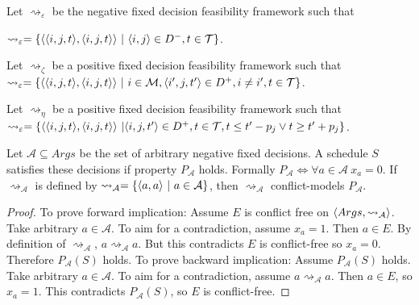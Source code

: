 \begin{definition}
	\label{intervalepsilon}
	
	Let $\rightsquigarrow_\varepsilon$ be the negative fixed decision feasibility framework such that
	
	$\rightsquigarrow_\varepsilon=\{\pair{\triple{i}{j}{t}}{\triple{i}{j}{t}}\ |\ \pair{i}{j}\in D^-,t\in\mathcal{T}\}$.
\end{definition}

\begin{definition}
	\label{intervalzeta}
	
	Let $\rightsquigarrow_\zeta$ be a positive fixed decision feasibility framework such that
	$\rightsquigarrow_\varepsilon=\{\pair{\triple{i}{j}{t}}{\triple{i}{j}{t}}\ |\ i\in\mathcal{M}, \triple{i'}{j}{t'}\in D^+, i\neq i', t\in\mathcal{T}\}$.
\end{definition}

\begin{definition}
	\label{intervaleta}
	
	Let $\rightsquigarrow_\eta$ be a positive fixed decision feasibility framework such that
	$\rightsquigarrow_\varepsilon=\{\pair{\triple{i}{j}{t}}{\triple{i}{j}{t}}\ |\triple{i}{j}{t'}\in D^+, t\in\mathcal{T}, t\leq t'-p_j\lor t\geq t'+p_j\}$.
\end{definition}

\begin{lemma}
	\label{conflictfreenessset}
	Let $\mathcal{A}\subseteq Args$ be the set of arbitrary negative fixed decisions. A schedule $S$ satisfies these decisions if property $P_\mathcal{A}$ holds. Formally $P_\mathcal{A}\iff\forall a\in\mathcal{A}\ x_a=0$. If $\rightsquigarrow_\mathcal{A}$ is defined by $\rightsquigarrow_\mathcal{A}=\{\pair{a}{a}\ |\ a\in\mathcal{A}\}$, then $\rightsquigarrow_\mathcal{A}$ conflict-models $P_\mathcal{A}$.

	\begin{proof}
		To prove forward implication: Assume $E$ is conflict free on $\langle{Args},{\rightsquigarrow_\mathcal{A}}\rangle$. Take arbitrary $a\in\mathcal{A}$. To aim for a contradiction, assume $x_a=1$. Then $a\in E$. By definition of $\rightsquigarrow_\mathcal{A}$, $a\rightsquigarrow_\mathcal{A} a$. But this contradicts $E$ is conflict-free so $x_a=0$. Therefore $P_\mathcal{A}(S)$ holds.
		\linespace
		To prove backward implication: Assume $P_\mathcal{A}(S)$ holds. Take arbitrary $a\in\mathcal{A}$. To aim for a contradiction, assume $a\rightsquigarrow_\mathcal{A}a$. Then $a\in E$, so $x_a=1$. This contradicts $P_\mathcal{A}(S)$, so $E$ is conflict-free.
	\end{proof}
\end{lemma}


